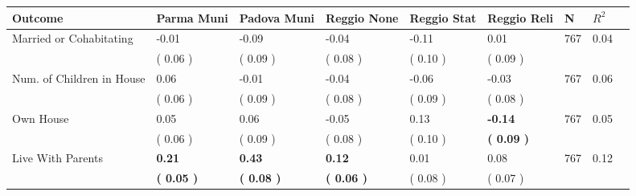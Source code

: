 \begin{tabular}{L{6.2cm} C{1.8cm} C{1.8cm} C{1.8cm} C{1.8cm} C{1.8cm} C{1.8cm} C{0.3cm} C{0.3cm}}
\toprule
 \textbf{Outcome} & \textbf{Parma Muni} & \textbf{Padova Muni} & \textbf{Reggio None} & \textbf{Reggio Stat} & \textbf{Reggio Reli} & \textbf{N} & \textbf{$ R^2$} \\
\midrule
Married or Cohabitating &     -0.01 &     -0.09 &     -0.04 &     -0.11 &      0.01  & 767 &       0.04 \\ 
 & (     0.06 ) & (     0.09 ) & (     0.08 ) & (     0.10 ) & (     0.09 )  & \\
Num. of Children in House &      0.06 &     -0.01 &     -0.04 &     -0.06 &     -0.03  & 767 &       0.06 \\ 
 & (     0.06 ) & (     0.09 ) & (     0.08 ) & (     0.09 ) & (     0.08 )  & \\
Own House &      0.05 &      0.06 &     -0.05 &      0.13 & \textbf{    -0.14}  & 767 &       0.05 \\ 
 & (     0.06 ) & (     0.09 ) & (     0.08 ) & (     0.10 ) & \textbf{(     0.09 )}  & \\
Live With Parents & \textbf{     0.21} & \textbf{     0.43} & \textbf{     0.12} &      0.01 &      0.08  & 767 &       0.12 \\ 
 & \textbf{(     0.05 )} & \textbf{(     0.08 )} & \textbf{(     0.06 )} & (     0.08 ) & (     0.07 )  & \\
\bottomrule
\end{tabular}
